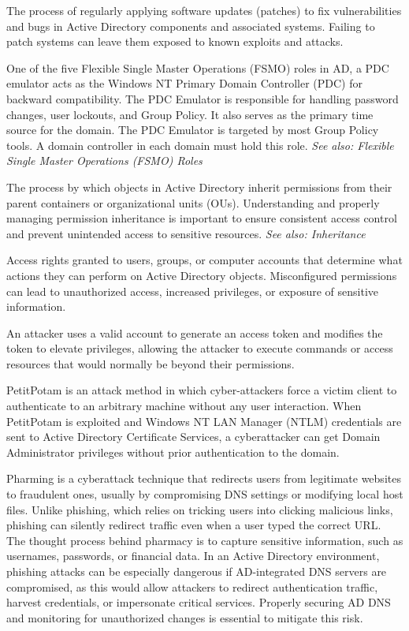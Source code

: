  The process of regularly applying software updates (patches) to fix vulnerabilities and bugs in Active Directory components and associated systems. Failing to patch systems can leave them exposed to known exploits and attacks.

 One of the five Flexible Single Master Operations (FSMO) roles in AD, a PDC emulator acts as the Windows NT Primary Domain Controller (PDC) for backward compatibility. The PDC Emulator is responsible for handling password changes, user lockouts, and Group Policy. It also serves as the primary time source for the domain. The PDC Emulator is targeted by most Group Policy tools. A domain controller in each domain must hold this role.
\textit{See also: Flexible Single Master Operations (FSMO) Roles}

 The process by which objects in Active Directory inherit permissions from their parent containers or organizational units (OUs). Understanding and properly managing permission inheritance is important to ensure consistent access control and prevent unintended access to sensitive resources.
\textit{See also: Inheritance}

 Access rights granted to users, groups, or computer accounts that determine what actions they can perform on Active Directory objects. Misconfigured permissions can lead to unauthorized access, increased privileges, or exposure of sensitive information.

 An attacker uses a valid account to generate an access token and modifies the token to elevate privileges, allowing the attacker to execute commands or access resources that would normally be beyond their permissions.

 PetitPotam is an attack method in which cyber-attackers force a victim client to authenticate to an arbitrary machine without any user interaction. When PetitPotam is exploited and Windows NT LAN Manager (NTLM) credentials are sent to Active Directory Certificate Services, a cyberattacker can get Domain Administrator privileges without prior authentication to the domain.

 Pharming is a cyberattack technique that redirects users from legitimate websites to fraudulent ones, usually by compromising DNS settings or modifying local host files. Unlike phishing, which relies on tricking users into clicking malicious links, phishing can silently redirect traffic even when a user typed the correct URL. The thought process behind pharmacy is to capture sensitive information, such as usernames, passwords, or financial data. In an Active Directory environment, phishing attacks can be especially dangerous if AD-integrated DNS servers are compromised, as this would allow attackers to redirect authentication traffic, harvest credentials, or impersonate critical services. Properly securing AD DNS and monitoring for unauthorized changes is essential to mitigate this risk.

